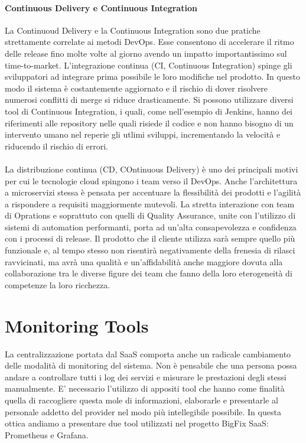 \paragraph{Continuous Delivery e Continuous Integration}
 La Continuoud Delivery e la Continuous Integration sono due pratiche strettamente correlate ai metodi DevOps. Esse consentono di accelerare il ritmo delle release fino molte volte al giorno avendo un impatto importantissimo sul time-to-market. L'integrazione continua (CI, Continuous Integration) spinge gli sviluppatori ad integrare prima possibile le loro modifiche nel prodotto. In questo modo il sistema è costantemente aggiornato e il rischio di dover risolvere numerosi conflitti di merge si riduce drasticamente. Si possono utilizzare diversi tool di Continuous Integration, i quali, come nell'esempio di Jenkins, hanno dei riferimenti alle repository nelle quali risiede il codice e non hanno bisogno di un intervento umano nel reperie gli utlimi sviluppi, incrementando la velocità e riducendo il rischio di errori.
 
 \paragraph{}
 La distribuzione continua (CD, COntinuous Delivery) è uno dei principali motivi per cui le tecnologie cloud spingono i team verso il DevOps. Anche l'architettura a microservizi stessa è pensata per accentuare la flessibilità dei prodotti e l'agilità a rispondere a requisiti maggiormente mutevoli. La stretta interazione con team di Oprations e soprattuto con quelli di Quality Assurance, unite con l'utilizzo di sistemi di automation performanti, porta ad un'alta consapevolezza e confidenza con i processi di release. Il prodotto che il cliente utilizza sarà sempre quello più funzionale e, al tempo stesso non risentirà negativamente della frenesia di rilasci ravvicinati, ma avrà una qualità e un'affidabilità anche maggiore dovuta alla collaborazione tra le diverse figure dei team che fanno della loro eterogeneità di competenze la loro ricchezza.

\section{Monitoring Tools}
La centralizzazione portata dal SaaS comporta anche un radicale cambiamento delle modalità di monitoring del sistema. Non è pensabile che una persona possa andare a controllare tutti i log dei servizi e misurare le prestazioni degli stessi manualmente. E' necessario l'utilizzo di appositi tool che hanno come finalità quella di raccogliere questa mole di informazioni, elaborarle e presentarle al personale addetto del provider nel modo più intellegibile possibile. In questa ottica andiamo a presentare due tool utilizzati nel progetto BigFix SaaS: Prometheus e Grafana.
